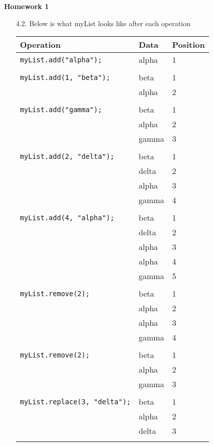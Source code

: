 \documentclass[10pt]{article}
\begin{document}
	\begin{center}
		\large{\textbf{Homework 1}}
	\end{center}
	
	\begin{enumerate}
		\item[4.2.] Below is what myList looks like after each operation
		
			\begin{tabular}{l l l}
				Operation & Data & Position\\
				\hline
				\texttt{myList.add("alpha");} & alpha & 1\\\\
				\hline
				\texttt{myList.add(1, "beta");} & beta & 1\\
				& alpha & 2\\\\
				\hline
				\texttt{myList.add("gamma");} & beta & 1\\
				& alpha & 2\\
				& gamma & 3\\\\
				\hline
				\texttt{myList.add(2, "delta");} & beta & 1\\
				& delta & 2\\
				& alpha & 3\\
				& gamma & 4\\\\
				\hline
				\texttt{myList.add(4, "alpha");} & beta & 1\\
				& delta & 2\\
				& alpha & 3\\
				& alpha & 4\\
				& gamma & 5\\\\
				\hline
				\texttt{myList.remove(2);} & beta & 1\\
				& alpha & 2\\
				& alpha & 3\\
				& gamma & 4\\\\
				\hline
				\texttt{myList.remove(2);} & beta & 1\\
				& alpha & 2\\
				& gamma & 3\\\\
				\hline
				\texttt{myList.replace(3, "delta");} & beta & 1\\
				& alpha & 2\\
				& delta & 3\\\\
				\hline
			\end{tabular}
			

\end{enumerate}
\end{document}
